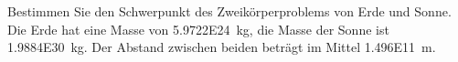 
\begin{aufgabe}
	Bestimmen Sie den Schwerpunkt des Zweikörperproblems von Erde und Sonne.
	Die Erde hat eine Masse von \SI{5.9722E24}{kg}, die Masse der Sonne ist \SI{1.9884E30}{kg}.
	Der Abstand zwischen beiden beträgt im Mittel \SI{1.496E11}{m}.
\end{aufgabe}
